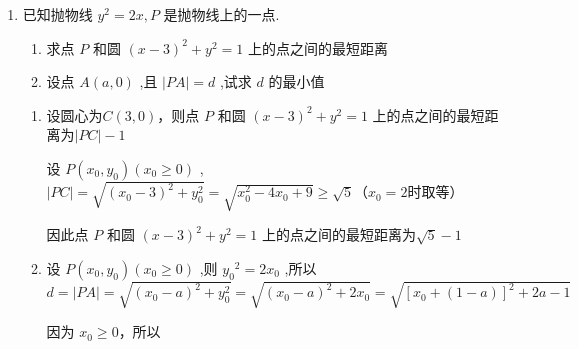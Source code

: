 \begin{enumerate}
\begin{jieda}
        又 ${x}_{1}{x}_{2} = \dfrac{{p}^{2}}{4},{x}_{1} + {x}_{2} = \left| {AB}\right|  - p$，代入上式，得$\dfrac{1}{\left| AF\right| } + \dfrac{1}{\left| BF\right| } = \dfrac{\left| AB\right| }{\dfrac{{p}^{2}}{4} + \dfrac{p}{2}\left( {\left| {AB}\right|  - p}\right)  + \dfrac{{p}^{2}}{4}} = \dfrac{2}{p}$.
        
        所以, $\dfrac{1}{\left| AF\right| } + \dfrac{1}{\left| BF\right| }$ 为定值 $\dfrac{2}{p}$ .
    \end{jieda}

    \item 已知抛物线 ${y}^{2} = {2x},{P}$ 是抛物线上的一点.
    \begin{enumerate}
        \item 求点 ${P}$ 和圆 ${\left( x - 3\right) }^{2} + {y}^{2} = 1$ 上的点之间的最短距离
        \item 设点 $A\left( {a,0}\right)$ ,且 $\left| {PA}\right|  = d$ ,试求 $d$ 的最小值
    \end{enumerate}
    \begin{jieda}
        \begin{enumerate}
            \item 设圆心为$C(3, 0)$，则点 ${P}$ 和圆 ${\left( x - 3\right) }^{2} + {y}^{2} = 1$ 上的点之间的最短距离为$|PC| - 1$
            
            设 $P\left( {{x}_{0},{y}_{0}}\right) \left( {{x}_{0} \geq  0}\right)$ ,$|PC| = \sqrt{(x_0-3)^2+y_0^2} = \sqrt{x_0^2-4x_0+9} \geq \sqrt{5}$（$x_0 = 2$时取等）

            因此点 ${P}$ 和圆 ${\left( x - 3\right) }^{2} + {y}^{2} = 1$ 上的点之间的最短距离为$\sqrt{5}-1$
            \item 设 $P\left( {{x}_{0},{y}_{0}}\right) \left( {{x}_{0} \geq  0}\right)$ ,则 ${y}_{0}{}^{2} = 2{x}_{0}$ ,所以$d = \left| {PA}\right|  = \sqrt{{\left( {x}_{0} - a\right) }^{2} + {y}_{0}^{2}} = \sqrt{{\left( {x}_{0} - a\right) }^{2} + 2{x}_{0}} =  \sqrt{{\left\lbrack  {x}_{0} + \left( 1 - a\right) \right\rbrack  }^{2} + {2a} - 1}$
            
            因为 ${x}_{0} \geq  0$，所以
        \end{enumerate}
    \end{jieda}


\end{enumerate}

